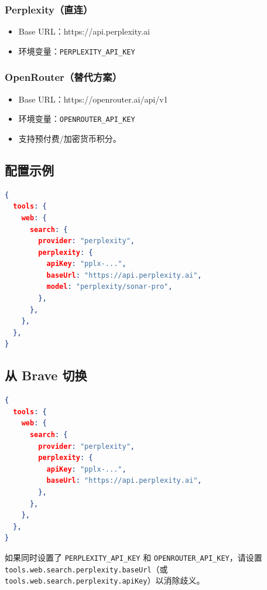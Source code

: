 \subsubsection{Perplexity（直连）}


\begin{itemize}
  \item Base URL：https://api.perplexity.ai
  \item 环境变量：\texttt{PERPLEXITY\_API\_KEY}
\end{itemize}


\subsubsection{OpenRouter（替代方案）}


\begin{itemize}
  \item Base URL：https://openrouter.ai/api/v1
  \item 环境变量：\texttt{OPENROUTER\_API\_KEY}
  \item 支持预付费/加密货币积分。
\end{itemize}


\subsection{配置示例}


\begin{lstlisting}[language=json]
{
  tools: {
    web: {
      search: {
        provider: "perplexity",
        perplexity: {
          apiKey: "pplx-...",
          baseUrl: "https://api.perplexity.ai",
          model: "perplexity/sonar-pro",
        },
      },
    },
  },
}
\end{lstlisting}


\subsection{从 Brave 切换}


\begin{lstlisting}[language=json]
{
  tools: {
    web: {
      search: {
        provider: "perplexity",
        perplexity: {
          apiKey: "pplx-...",
          baseUrl: "https://api.perplexity.ai",
        },
      },
    },
  },
}
\end{lstlisting}


如果同时设置了 \texttt{PERPLEXITY\_API\_KEY} 和 \texttt{OPENROUTER\_API\_KEY}，请设置 \texttt{tools.web.search.perplexity.baseUrl}（或 \texttt{tools.web.search.perplexity.apiKey}）以消除歧义。

